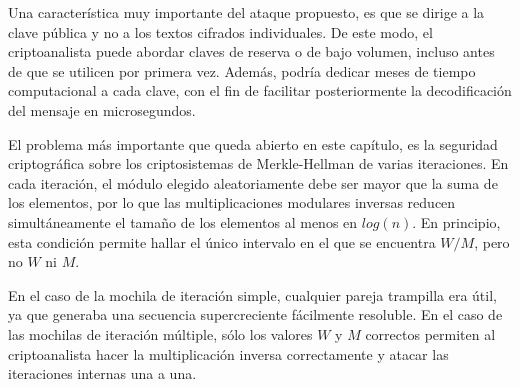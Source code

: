     Una característica muy importante del ataque propuesto, es que se dirige a la clave pública y no a los textos cifrados individuales. De este modo, el criptoanalista puede abordar claves de reserva o de bajo volumen, incluso antes de que se utilicen por primera vez. Además, podría dedicar meses de tiempo computacional a cada clave, con el fin de facilitar posteriormente la decodificación del mensaje en microsegundos.

    El problema más importante que queda abierto en este capítulo, es la seguridad criptográfica sobre los criptosistemas de Merkle-Hellman de varias iteraciones. En cada iteración, el módulo elegido aleatoriamente debe ser mayor que la suma de los elementos, por lo que las multiplicaciones modulares inversas reducen simultáneamente el tamaño de los elementos al menos en $log(n)$. En principio, esta condición permite hallar el único intervalo en el que se encuentra $W/M$, pero no $W$ ni $M$. 

    En el caso de la mochila de iteración simple, cualquier pareja trampilla era útil, ya que generaba una secuencia supercreciente fácilmente resoluble. En el caso de las mochilas de iteración múltiple, sólo los valores $W$ y $M$ correctos permiten al criptoanalista hacer la multiplicación inversa correctamente y atacar las iteraciones internas una a una.

\endinput